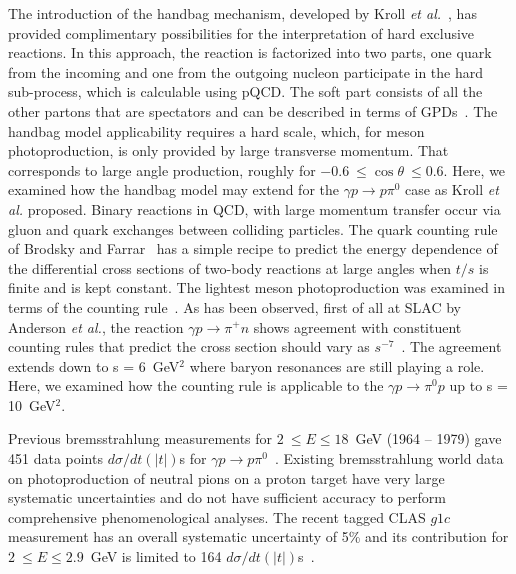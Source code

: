 \documentclass[aps,prc,twocolumn,floatfix,showpacs,preprintnumbers,amsmath,amssymb,superscriptaddress]{revtex4-1}
\begin{document}
The introduction of the handbag mechanism, 
developed by Kroll \textit{et al.}~\cite{Kroll}, has provided 
complimentary possibilities for the interpretation of hard 
exclusive reactions. In this approach, the reaction is factorized 
into two parts, one quark from the incoming and one from the 
outgoing nucleon participate in the hard sub-process, which is 
calculable using pQCD. The soft part consists of all the 
other partons that are spectators and can be described in 
terms of GPDs~\cite{HM}. The handbag model applicability 
requires a hard scale, which, for meson photoproduction, is only 
provided by large transverse momentum. That corresponds to large 
angle production, roughly
for $-0.6~\leq\cos\theta~\leq 0.6$.  Here, we examined how 
the handbag model may extend for the $\gamma p\to p\pi^0$ 
case as Kroll \textit{et al.} proposed.  
Binary reactions in QCD, with large momentum 
transfer occur via 
gluon and quark exchanges between colliding particles. The 
quark counting rule of Brodsky and 
Farrar~\cite{Stan} has a simple recipe to predict the energy 
dependence of the differential cross sections of two-body
reactions at large angles when $t/s$ is finite and is kept 
constant.  The lightest meson photoproduction was examined 
in terms of the counting rule~\cite{Anderson,Jenkins,Zhu,
Chen,Kong}. As has been observed, first of all at SLAC by 
Anderson \textit{et al.}, the reaction $\gamma p\to\pi^+n$ 
shows agreement with constituent counting rules that predict 
the cross section should vary as $s^{-7}$~\cite{Anderson}. 
The agreement extends down to s = 6~GeV$^2$ where baryon 
resonances are still playing a role.  Here, we examined how
the counting rule is applicable to the $\gamma p\to\pi^0p$ 
up to s = 10~GeV$^2$.

Previous bremsstrahlung measurements for $2~\leq E\leq 
18$~GeV (1964 -- 1979) gave 451 data points $d\sigma/dt(|t|)$s for 
$\gamma p\to p\pi^0$~\cite{brem}.  Existing bremsstrahlung 
world data on photoproduction of neutral pions on a proton 
target have very large systematic uncertainties and do not 
have sufficient accuracy to perform comprehensive 
phenomenological analyses.  
The recent tagged CLAS $g1c$ 
measurement has an overall systematic uncertainty of 5\% and 
its contribution for $2~\leq E\leq 2.9$~GeV is limited to 
164 $d\sigma/dt(|t|)$s~\cite{du07}.  
\end{document}
